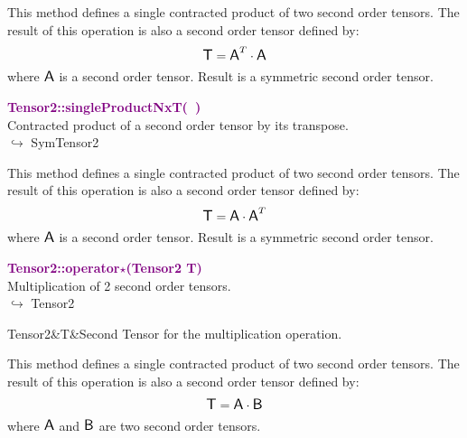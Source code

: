 This method defines a single contracted product of two second order tensors.
The result of this operation is also a second order tensor defined by:
\begin{equation*}
\mbox{\large\ensuremath{\mathsf{T}}} = \mbox{\large\ensuremath{\mathsf{A}}}^T\cdot \mbox{\large\ensuremath{\mathsf{A}}}
\end{equation*}
where $\mbox{\large\ensuremath{\mathsf{A}}}$ is a second order tensor. Result is a symmetric second order tensor.

\textcolor{purple}{\textbf{Tensor2::singleProductNxT(~)}}\label{Tensor2::singleProductNxT()}\\
Contracted product of a second order tensor by its transpose.\\ \hspace*{10mm}$\hookrightarrow$ SymTensor2

This method defines a single contracted product of two second order tensors.
The result of this operation is also a second order tensor defined by:
\begin{equation*}
\mbox{\large\ensuremath{\mathsf{T}}} = \mbox{\large\ensuremath{\mathsf{A}}} \cdot \mbox{\large\ensuremath{\mathsf{A}}}^T
\end{equation*}
where $\mbox{\large\ensuremath{\mathsf{A}}}$ is a second order tensor. Result is a symmetric second order tensor.

\textcolor{purple}{\textbf{Tensor2::operator$\star$(Tensor2 T)}}\label{Tensor2::operator*(Tensor2 T)}\\
Multiplication of 2 second order tensors.\\ \hspace*{10mm}$\hookrightarrow$ Tensor2

\begin{tcolorbox}[width=\textwidth,myArgs,tabularx={ll|R}]
Tensor2&T&Second Tensor for the multiplication operation.
\end{tcolorbox}

This method defines a single contracted product of two second order tensors.
The result of this operation is also a second order tensor defined by:
\begin{equation*}
\mbox{\large\ensuremath{\mathsf{T}}} = \mbox{\large\ensuremath{\mathsf{A}}} \cdot \mbox{\large\ensuremath{\mathsf{B}}}
\end{equation*}
where $\mbox{\large\ensuremath{\mathsf{A}}}$ and $\mbox{\large\ensuremath{\mathsf{B}}}$ are two second order tensors.

